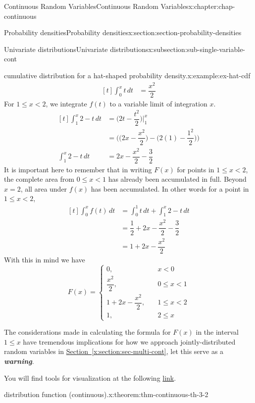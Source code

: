 \documentclass[oneside,10pt,]{book}
\newcommand{\xreffont}{\relax}
\newcommand{\alert}[1]{\textbf{\textit{#1}}}
\newcommand{\lt}{<}
\newcommand{\amp}{&}
\begin{document}
\begin{chapterptx}{Continuous Random Variables}{}{Continuous Random Variables}{}{}{x:chapter:chap-continuous}
\begin{sectionptx}{Probability densities}{}{Probability densities}{}{}{x:section:section-probability-densities}
\begin{subsectionptx}{Univariate distributions}{}{Univariate distributions}{}{}{x:subsection:sub-single-variable-cont}
\begin{example}{cumulative distribution for a hat-shaped probability density.}{x:example:ex-hat-cdf}
\begin{equation*}
\begin{aligned}[t]
\int_0^x t\,dt \amp = \dfrac{x^2}{2}
\end{aligned}
\end{equation*}
For \(1 \le x \lt 2\), we integrate \(f(t)\) to a variable limit of integration \(x\).%
\begin{equation*}
\begin{aligned}[t]
\int_1^x 2-t\,dt \amp = \Big(2t-\dfrac{t^2}{2}\Big)\Big|_1^x\\
\amp = \Big(\Big(2x - \dfrac{x^2}{2}\Big) - \Big(2(1) -
\dfrac{1^2}{2}\Big)\Big)\\
\int_1^x 2-t\,dt \amp = 2x - \dfrac{x^2}{2} - \dfrac{3}{2}
\end{aligned}
\end{equation*}
It is important here to remember that in writing \(F(x)\) for points in \(1 \le x \lt 2\), the complete area from \(0 \le x \lt 1\) has already been accumulated in full. Beyond \(x = 2\), all area under \(f(x)\) has been accumulated. In other words for a point in \(1 \le x \lt 2\),%
\begin{equation*}
\begin{aligned}[t] 
\int_0^x f(t)\,dt \amp = \int_0^1 t\,dt + \int_1^x 2-t\,dt\\
\amp = \dfrac{1}{2} + 2x - \dfrac{x^2}{2} - \dfrac{3}{2}\\
\amp = 1 + 2x - \dfrac{x^2}{2}
\end{aligned}
\end{equation*}
With this in mind we have%
\begin{equation*}
F(x) = \begin{cases}
0,\amp \quad x \lt 0\\
\dfrac{x^2}{2}, \amp \quad 0 \le x \lt 1\\
1 + 2x - \dfrac{x^2}{2}, \amp \quad 1 \le x
\lt 2\\
1, \amp \quad 2 \le x
\end{cases}
\end{equation*}
%
\end{example}
The considerations made in calculating the formula for \(F(x)\) in the interval \(1 \le x\) have tremendous implications for how we approach jointly-distributed random variables in \hyperref[x:section:sec-multi-cont]{Section~{\xreffont\ref{x:section:sec-multi-cont}}}, let this serve as a \alert{warning}.%
\par
You will find tools for visualization at the following \href{https://buddy.uco.edu/shiny/slaverty/mathstat/pdf_cdf/}{link}.%
\begin{theorem}{distribution function (continuous).}{}{x:theorem:thm-continuous-th-3-2}%

\end{theorem}
\end{subsectionptx}
\end{sectionptx}
\end{chapterptx}
\end{document}
